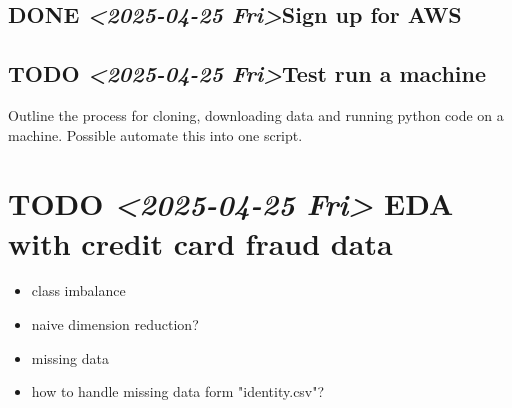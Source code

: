 \documentclass[11pt]{article}
\begin{document}
\subsection*{{\bfseries\sffamily DONE} \textit{<2025-04-25 Fri>}Sign up for AWS}
\label{sec:org5120248}
\subsection*{{\bfseries\sffamily TODO} \textit{<2025-04-25 Fri>}Test run a machine}
\label{sec:org3c22179}
Outline the process for cloning, downloading data and running python code
on a machine. Possible automate this into one script.


\section*{{\bfseries\sffamily TODO} \textit{<2025-04-25 Fri> } EDA with credit card fraud data}
\label{sec:org4c8308d}
\begin{itemize}
\item class imbalance
\item naive dimension reduction?
\item missing data
\item how to handle missing data form "identity.csv"?
\end{itemize}
\end{document}
